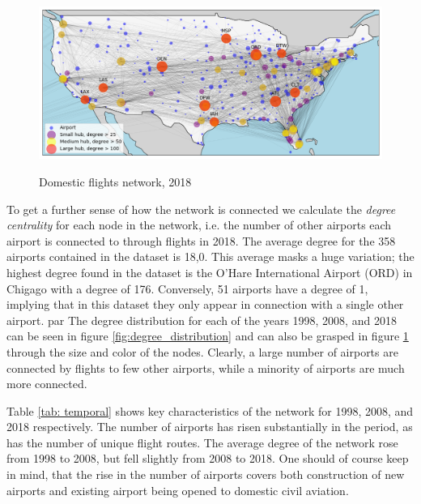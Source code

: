 \begin{figure}[H]
  \centering
  \caption{Domestic flights network, 2018}
    \includegraphics[width=1. \textwidth]{Exam/Figures/map_general_18}
    \vspace{-0.7cm}
  \label{fig:map_general_18}
\end{figure}
\noindent
To get a further sense of how the network is connected we calculate the \textit{degree centrality} for each node in the network, i.e. the number of other airports each airport is connected to through flights in 2018. The average degree for the 358 airports contained in the dataset is 18,0. This average masks a huge variation; the highest degree found in the dataset is the O'Hare International Airport (ORD) in Chigago with a degree of 176.  Conversely, 51 airports have a degree of 1, implying that in this dataset they only appear in connection with a single other airport. par
The degree distribution for each of the years 1998, 2008, and 2018 can be seen in figure \ref{fig:degree_distribution} and can also be grasped in figure \ref{fig:map_general_18} through the size and color of the nodes. Clearly, a large number of airports are connected by flights to few other airports, while a minority of airports are much more connected.
\par
Table \ref{tab: temporal} shows key characteristics of the network for 1998, 2008, and 2018 respectively. The number of airports has risen substantially in the period, as has the number of unique flight routes. The average degree of the network rose from 1998 to 2008, but fell slightly from 2008 to 2018. One should of course keep in mind, that the rise in the number of airports  covers both construction of new airports and existing airport being opened to domestic civil aviation. %
